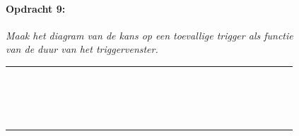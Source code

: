 \begin{figure}[h]

\paragraph{Opdracht 9:}

\textit{Maak het diagram van de kans op een toevallige trigger als
functie van de duur van het triggervenster.\bigskip{}
}

\begin{tabular}{|>{\centering}p{0.1cm}|>{\centering}p{0.1cm}|>{\centering}p{0.1cm}|>{\centering}p{0.1cm}|>{\centering}p{0.1cm}|>{\centering}p{0.1cm}|>{\centering}p{0.1cm}|>{\centering}p{0.1cm}|>{\centering}p{0.1cm}|>{\centering}p{0.1cm}|>{\centering}p{0.1cm}|>{\centering}p{0.1cm}|>{\centering}p{0.1cm}|>{\centering}p{0.1cm}|>{\centering}p{0.1cm}|>{\centering}p{0.1cm}|>{\centering}p{0.1cm}|>{\centering}p{0.1cm}|>{\centering}p{0.1cm}|>{\centering}p{0.1cm}|>{\centering}p{0.1cm}|>{\centering}p{0.1cm}|>{\centering}p{0.1cm}|>{\centering}p{0.1cm}|>{\centering}p{0.1cm}|>{\centering}p{0.1cm}|>{\centering}p{0.1cm}|>{\centering}p{0.1cm}|>{\centering}p{0.1cm}|}
\hline 
 &  &  &  &  &  &  &  &  &  &  &  &  &  &  &  &  &  &  &  &  &  &  &  &  &  &  &  & \tabularnewline
\hline 
 &  &  &  &  &  &  &  &  &  &  &  &  &  &  &  &  &  &  &  &  &  &  &  &  &  &  &  & \tabularnewline
\hline 
 &  &  &  &  &  &  &  &  &  &  &  &  &  &  &  &  &  &  &  &  &  &  &  &  &  &  &  & \tabularnewline
\hline 
 &  &  &  &  &  &  &  &  &  &  &  &  &  &  &  &  &  &  &  &  &  &  &  &  &  &  &  & \tabularnewline
\hline 
 &  &  &  &  &  &  &  &  &  &  &  &  &  &  &  &  &  &  &  &  &  &  &  &  &  &  &  & \tabularnewline
\hline 
 &  &  &  &  &  &  &  &  &  &  &  &  &  &  &  &  &  &  &  &  &  &  &  &  &  &  &  & \tabularnewline
\hline 
 &  &  &  &  &  &  &  &  &  &  &  &  &  &  &  &  &  &  &  &  &  &  &  &  &  &  &  & \tabularnewline
\hline 
 &  &  &  &  &  &  &  &  &  &  &  &  &  &  &  &  &  &  &  &  &  &  &  &  &  &  &  & \tabularnewline
\hline 
 &  &  &  &  &  &  &  &  &  &  &  &  &  &  &  &  &  &  &  &  &  &  &  &  &  &  &  & \tabularnewline
\hline 
 &  &  &  &  &  &  &  &  &  &  &  &  &  &  &  &  &  &  &  &  &  &  &  &  &  &  &  & \tabularnewline
\hline 
 &  &  &  &  &  &  &  &  &  &  &  &  &  &  &  &  &  &  &  &  &  &  &  &  &  &  &  & \tabularnewline
\hline 
 &  &  &  &  &  &  &  &  &  &  &  &  &  &  &  &  &  &  &  &  &  &  &  &  &  &  &  & \tabularnewline
\hline 
 &  &  &  &  &  &  &  &  &  &  &  &  &  &  &  &  &  &  &  &  &  &  &  &  &  &  &  & \tabularnewline
\hline 
 &  &  &  &  &  &  &  &  &  &  &  &  &  &  &  &  &  &  &  &  &  &  &  &  &  &  &  & \tabularnewline
\hline 
 &  &  &  &  &  &  &  &  &  &  &  &  &  &  &  &  &  &  &  &  &  &  &  &  &  &  &  & \tabularnewline
\hline 
 &  &  &  &  &  &  &  &  &  &  &  &  &  &  &  &  &  &  &  &  &  &  &  &  &  &  &  & \tabularnewline
\hline 
 &  &  &  &  &  &  &  &  &  &  &  &  &  &  &  &  &  &  &  &  &  &  &  &  &  &  &  & \tabularnewline
\hline 
 &  &  &  &  &  &  &  &  &  &  &  &  &  &  &  &  &  &  &  &  &  &  &  &  &  &  &  & \tabularnewline
\hline 
\end{tabular}
\end{figure}


